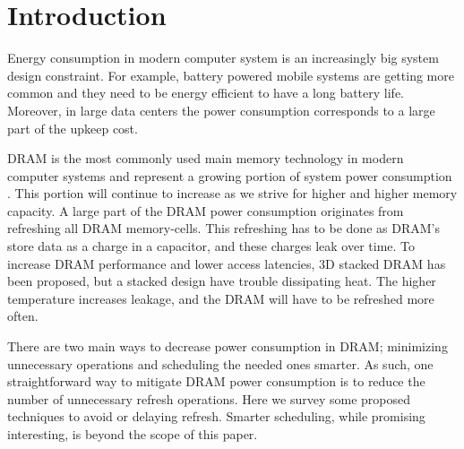 \section{Introduction}
\label{sec:int}

Energy consumption in modern computer system is an increasingly big system design constraint. For example, battery powered mobile systems are getting more common and they need to be energy efficient to have a long battery life. Moreover, in large data centers the power consumption corresponds to a large part of the upkeep cost. 

DRAM is the most commonly used main memory technology in modern computer systems and represent a growing portion of system power consumption \cite{exascale}. This portion will continue to increase as we strive for higher and higher memory capacity. A large part of the DRAM power consumption originates from refreshing all DRAM memory-cells. This refreshing has to be done as DRAM's store data as a charge in a capacitor, and these charges leak over time. To increase DRAM performance and lower access latencies, 3D stacked DRAM has been proposed, but a stacked design have trouble dissipating heat. The higher temperature increases leakage, and the DRAM will have to be refreshed more often.

There are two main ways to decrease power consumption in DRAM; minimizing unnecessary operations and scheduling the needed ones smarter. As such, one straightforward way to mitigate DRAM power consumption is to reduce the number of unnecessary refresh operations. Here we survey some proposed techniques to avoid or delaying refresh. Smarter scheduling, while promising interesting, is beyond the scope of this paper.